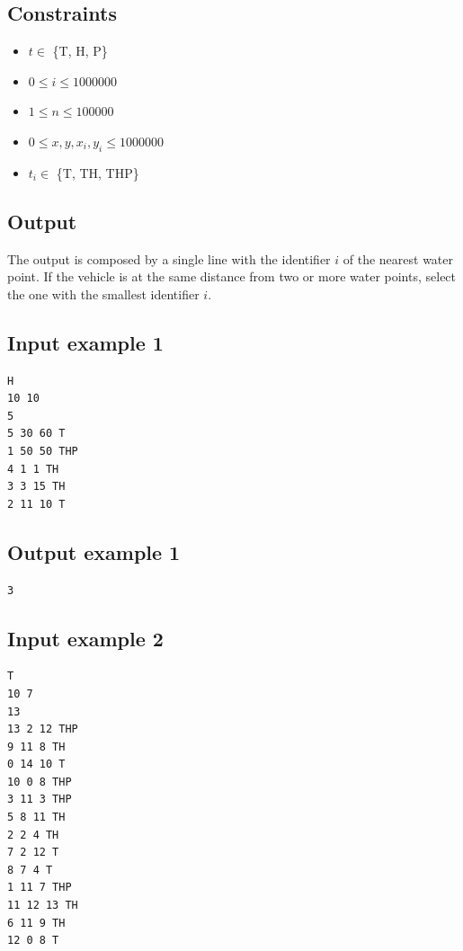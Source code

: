 \documentclass[11pt]{report}
\begin{document}
\subsection*{Constraints}

\begin{itemize}
        \item $t \in $ \{T, H, P\}
        \item $0 \leq i \leq 1000000$
        \item $1 \leq n \leq 100000$
        \item $0 \leq x, y, x_i, y_i \leq 1000000$
        \item $t_i \in $ \{T, TH, THP\}
\end{itemize}

\subsection*{Output}

The output is composed by a single line with the identifier $i$ of the nearest water point. If the vehicle is at the same distance from two or more water points, select the one with the smallest identifier $i$.

\subsection*{Input example 1}

\begin{verbatim}
H
10 10
5
5 30 60 T
1 50 50 THP
4 1 1 TH
3 3 15 TH
2 11 10 T
\end{verbatim}

\subsection*{Output example 1}

\begin{verbatim}
3
\end{verbatim}

\subsection*{Input example 2}

\begin{verbatim}
T
10 7
13
13 2 12 THP
9 11 8 TH
0 14 10 T
10 0 8 THP
3 11 3 THP
5 8 11 TH
2 2 4 TH
7 2 12 T
8 7 4 T
1 11 7 THP
11 12 13 TH
6 11 9 TH
12 0 8 T
\end{verbatim}
\end{document}

